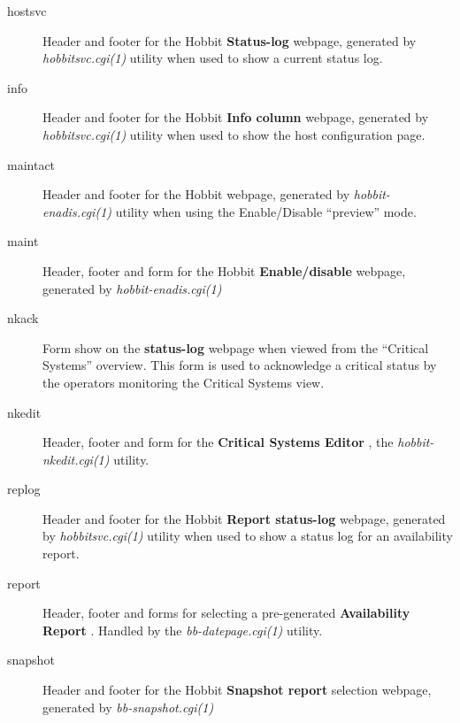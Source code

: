 \begin{description}
 

\item[hostsvc] Header and footer for the Hobbit \textbf{Status-log}
 webpage, generated by \emph{hobbitsvc.cgi(1)}
 utility when used to show a current status log. 

 

\item[info] Header and footer for the Hobbit \textbf{Info column}
 webpage, generated by \emph{hobbitsvc.cgi(1)}
 utility when used to show the host configuration page. 

 

\item[maintact] Header and footer for the Hobbit \textbf{}
 webpage, generated by \emph{hobbit-enadis.cgi(1)}
 utility when using the Enable/Disable ``preview'' mode. 

 

\item[maint] Header, footer and form for the Hobbit \textbf{Enable/disable}
 webpage, generated by \emph{hobbit-enadis.cgi(1)}


 

\item[nkack] Form show on the \textbf{status-log}
 webpage when viewed from the ``Critical Systems'' overview. This form is used to acknowledge a critical status by the operators monitoring the Critical Systems view. 

 

\item[nkedit] Header, footer and form for the \textbf{Critical Systems Editor}
, the \emph{hobbit-nkedit.cgi(1)}
 utility. 

 

\item[replog] Header and footer for the Hobbit \textbf{Report status-log}
 webpage, generated by \emph{hobbitsvc.cgi(1)}
 utility when used to show a status log for an availability report. 

 

\item[report] Header, footer and forms for selecting a pre-generated \textbf{Availability Report}
. Handled by the \emph{bb-datepage.cgi(1)}
 utility. 

 

\item[snapshot] Header and footer for the Hobbit \textbf{Snapshot report}
 selection webpage, generated by \emph{bb-snapshot.cgi(1)}


 


\end{description}

